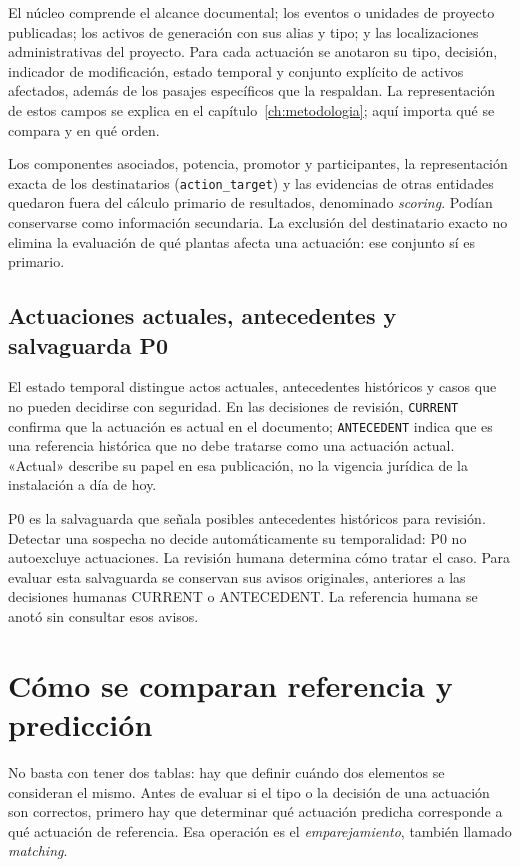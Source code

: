 El núcleo comprende el alcance documental; los eventos o unidades de
proyecto publicadas; los activos de generación con sus alias y tipo; y las
localizaciones administrativas del proyecto. Para cada actuación se anotaron
su tipo, decisión, indicador de modificación, estado temporal y conjunto
explícito de activos afectados, además de los pasajes específicos que la
respaldan. La representación de estos campos se explica en el
capítulo~\ref{ch:metodologia}; aquí importa qué se compara y en qué orden.

Los componentes asociados, potencia, promotor y participantes, la
representación exacta de los destinatarios (\texttt{action\_target}) y las
evidencias de otras entidades quedaron fuera del cálculo primario de
resultados, denominado \emph{scoring}. Podían conservarse como información
secundaria. La exclusión del destinatario exacto no elimina la evaluación
de qué plantas afecta una actuación: ese conjunto sí es primario.

\subsection{Actuaciones actuales, antecedentes y salvaguarda P0}
El estado temporal distingue actos actuales, antecedentes históricos y casos
que no pueden decidirse con seguridad. En las decisiones de revisión,
\texttt{CURRENT} confirma que la actuación es actual en el documento;
\texttt{ANTECEDENT} indica que es una referencia histórica que no debe
tratarse como una actuación actual. «Actual» describe su papel en esa
publicación, no la vigencia jurídica de la instalación a día de hoy.

P0 es la salvaguarda que señala posibles antecedentes históricos para
revisión. Detectar una sospecha no decide automáticamente su temporalidad:
P0 no autoexcluye actuaciones. La revisión humana determina cómo tratar el
caso. Para evaluar esta salvaguarda se conservan sus avisos originales,
anteriores a las decisiones humanas CURRENT o ANTECEDENT. La referencia
humana se anotó sin consultar esos avisos.

\section{Cómo se comparan referencia y predicción}
\label{sec:evaluador-v2b}
No basta con tener dos tablas: hay que definir cuándo dos elementos se
consideran el mismo. Antes de evaluar si el tipo o la decisión de una
actuación son correctos, primero hay que determinar qué actuación predicha
corresponde a qué actuación de referencia. Esa operación es el
\emph{emparejamiento}, también llamado \emph{matching}.

